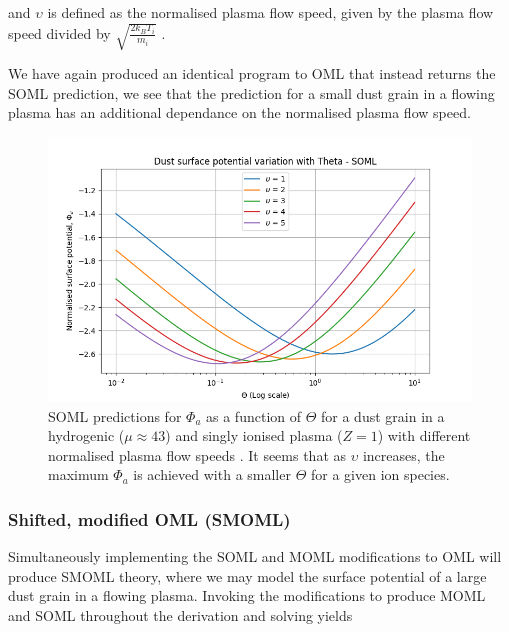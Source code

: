 \documentclass[journal]{Imperial_lab_report}
\begin{document}
\noindent and $\upsilon$ is defined as the normalised plasma flow speed, given by the plasma flow speed divided by $\sqrt{\frac{2 k_{B} T_{i}}{m_{i}}}$ \cite{Thomas}\cite{NormFactor}\cite{NormFactorCoppins}.

\medskip

We have again produced an identical program to OML that instead returns the SOML prediction, we see that the prediction for a small dust grain in a flowing plasma has an additional dependance on the normalised plasma flow speed.

\begin{figure}[H]
\centering
\includegraphics[width=\linewidth]{Output/SOMLgraph.jpeg}
\caption{SOML predictions for $\Phi_a$ as a function of $\Theta$ for a dust grain in a hydrogenic ($\mu \approx 43$) and singly ionised plasma ($Z=1$) with different normalised plasma flow speeds \cite{Thomas}. It seems that as $\upsilon$ increases, the maximum $\Phi_a$ is achieved with a smaller $\Theta$ for a given ion species.}
\label{SOMLgraph} 
\end{figure}

\subsubsection{Shifted, modified OML (SMOML)}

\medskip

Simultaneously implementing the SOML and MOML modifications to OML will produce SMOML theory, where we may model the surface potential of a large dust grain in a flowing plasma. Invoking the modifications to produce MOML and SOML throughout the derivation and solving yields 
\end{document}
